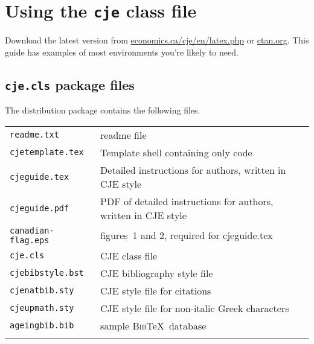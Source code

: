 \documentclass{cje}          %
\theoremstyle{plain}%
\theoremstyle{definition}
\theoremstyle{remark}
\begin{document}
\maketitle

\section{Using the \texttt{cje} class file}
Download the latest version from \href{https://economics.ca/cje/en/latex.php}{economics.ca/cje/en/latex.php} or \href{https://www.ctan.org/tex-archive/macros/latex/contrib/cje?lang=en}{ctan.org}. This guide has examples of most environments you're likely to need. 

\subsection{\texttt{cje.cls} package files}
The distribution package contains the following files.\\[0.5\baselineskip]
\begin{tabular}{@{}ll}
\texttt{readme.txt}        & readme file\\
\texttt{cjetemplate.tex}      & Template shell containing only code\\
\texttt{cjeguide.tex}      & Detailed instructions for authors, written in CJE style\\
\texttt{cjeguide.pdf}      & PDF of detailed instructions for authors, written in CJE style\\
\texttt{canadian-flag.eps} & figures~1 and 2, required for cjeguide.tex\\
\texttt{cje.cls}           & CJE class file\\
\texttt{cjebibstyle.bst}           & CJE bibliography style file\\
\texttt{cjenatbib.sty}     & CJE style file for citations\\
\texttt{cjeupmath.sty}     & CJE style file for non-italic Greek characters\\
\texttt{ageingbib.bib}     & sample \textsc{Bib}\TeX\ database\\ 
\mbox{}\\
\end{tabular}
\end{document}
